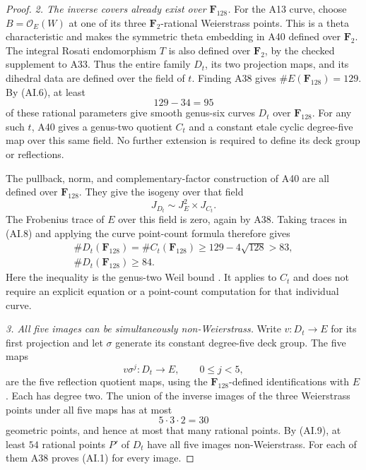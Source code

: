 \begin{proof}
\emph{2. The inverse covers already exist over $\mathbf F_{128}$.}
For the A13 curve, choose $B=\mathcal O_E(W)$ at one of
its three $\mathbf F_2$-rational Weierstrass points. This
is a theta characteristic and makes the symmetric theta
embedding in A40 defined over $\mathbf F_2$.
The integral Rosati endomorphism $T$ is also defined over
$\mathbf F_2$, by the checked supplement to A33.
Thus the entire family $D_t$, its two projection maps,
and its dihedral data are defined over the field of $t$.
Finding A38 gives $\#E(\mathbf F_{128})=129$.
By (AI.6), at least
\[
                              129-34=95
 \tag{AI.7}
\]
of these rational parameters give smooth genus-six curves
$D_t$ over $\mathbf F_{128}$. For any such $t$, A40 gives
a genus-two quotient $C_t$ and a constant etale cyclic
degree-five map over this same field. No further extension
is required to define its deck group or reflections.

The pullback, norm, and complementary-factor construction
of A40 are all defined over $\mathbf F_{128}$. They give
the isogeny over that field
\[
                      J_{D_t}\sim J_E^2\times J_{C_t}.
 \tag{AI.8}
\]
The Frobenius trace of $E$ over this field is zero, again
by A38. Taking traces in (AI.8) and applying the curve
point-count formula therefore gives
\[
 \begin{gathered}
 \#D_t(\mathbf F_{128})=\#C_t(\mathbf F_{128})
       \ge129-4\sqrt{128}>83,\\
                    \#D_t(\mathbf F_{128})\ge84.
 \end{gathered}
 \tag{AI.9}
\]
Here the inequality is the genus-two Weil bound
\cite[Theorem~11.1]{MilneJV}. It applies to $C_t$ and
does not require an explicit equation or a point-count
computation for that individual curve.

\emph{3. All five images can be simultaneously non-Weierstrass.}
Write $v:D_t\to E$ for its first projection and let
$\sigma$ generate its constant degree-five deck group.
The five maps
\[
                         v\sigma^j:D_t\longrightarrow E,
                              \qquad 0\le j<5,
 \tag{AI.10}
\]
are the five reflection quotient maps, using the
$\mathbf F_{128}$-defined identifications with $E$.
Each has degree two. The union of the inverse images of
the three Weierstrass points under all five maps has at
most
\[
                               5\cdot3\cdot2=30
 \tag{AI.11}
\]
geometric points, and hence at most that many rational
points. By (AI.9), at least $54$ rational points $P'$ of
$D_t$ have all five images non-Weierstrass. For each of
them A38 proves (AI.1) for every image.


\end{proof}
